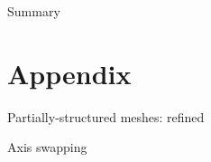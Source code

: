 \documentclass{beamer}
\begin{document}
\begin{frame}{Summary}

\end{frame}


\section{Appendix}

\begin{frame}{Partially-structured meshes: refined}

\end{frame}

\begin{frame}{Axis swapping}

\end{frame}
\end{document}
